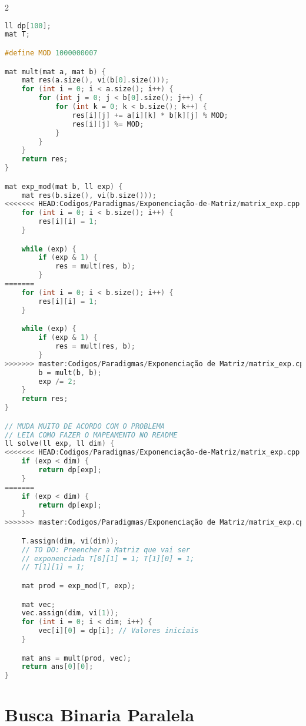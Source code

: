 \documentclass[11pt, a4paper, oneside]{book}
\begin{document}
\begin{multicols}{2}
\begin{lstlisting}[language=C++]
ll dp[100];
mat T;

#define MOD 1000000007

mat mult(mat a, mat b) {
    mat res(a.size(), vi(b[0].size()));
    for (int i = 0; i < a.size(); i++) {
        for (int j = 0; j < b[0].size(); j++) {
            for (int k = 0; k < b.size(); k++) {
                res[i][j] += a[i][k] * b[k][j] % MOD;
                res[i][j] %= MOD;
            }
        }
    }
    return res;
}

mat exp_mod(mat b, ll exp) {
    mat res(b.size(), vi(b.size()));
<<<<<<< HEAD:Codigos/Paradigmas/Exponenciação-de-Matriz/matrix_exp.cpp
    for (int i = 0; i < b.size(); i++) {
        res[i][i] = 1;
    }

    while (exp) {
        if (exp & 1) {
            res = mult(res, b);
        }
=======
    for (int i = 0; i < b.size(); i++) {
        res[i][i] = 1;
    }

    while (exp) {
        if (exp & 1) {
            res = mult(res, b);
        }
>>>>>>> master:Codigos/Paradigmas/Exponenciação de Matriz/matrix_exp.cpp
        b = mult(b, b);
        exp /= 2;
    }
    return res;
}

// MUDA MUITO DE ACORDO COM O PROBLEMA
// LEIA COMO FAZER O MAPEAMENTO NO README
ll solve(ll exp, ll dim) {
<<<<<<< HEAD:Codigos/Paradigmas/Exponenciação-de-Matriz/matrix_exp.cpp
    if (exp < dim) {
        return dp[exp];
    }
=======
    if (exp < dim) {
        return dp[exp];
    }
>>>>>>> master:Codigos/Paradigmas/Exponenciação de Matriz/matrix_exp.cpp

    T.assign(dim, vi(dim));
    // TO DO: Preencher a Matriz que vai ser
    // exponenciada T[0][1] = 1; T[1][0] = 1;
    // T[1][1] = 1;

    mat prod = exp_mod(T, exp);

    mat vec;
    vec.assign(dim, vi(1));
    for (int i = 0; i < dim; i++) {
        vec[i][0] = dp[i]; // Valores iniciais
    }

    mat ans = mult(prod, vec);
    return ans[0][0];
}\end{lstlisting}
\end{multicols}

\hfill

\section{Busca Binaria Paralela}
\end{document}
